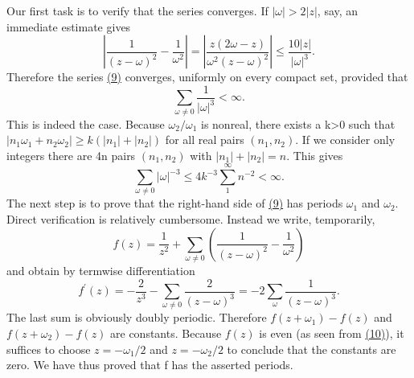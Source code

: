 Our first task is to verify that the series converges. If $|\omega| > 2|z|$, say, an immediate estimate gives
\begin{equation*}
\left| \frac {1}{(z - \omega) ^ {2}} - \frac {1}{\omega^ {2}} \right| = \left| \frac {z (2 \omega - z)}{\omega^ {2} (z - \omega) ^ {2}} \right| \leq \frac {10 | z |}{| \omega | ^ {3}}.
\end{equation*}
Therefore the series \hyperref[eq:7.9]{(9)} converges, uniformly on every compact set, provided that
\begin{equation*}
\sum_ {\omega \neq 0} \frac {1}{| \omega | ^ {3}} <   \infty .
\end{equation*}
This is indeed the case. Because $\omega_{2}/\omega_{1}$ is nonreal, there exists a k>0 such that $|n_{1}\omega_{1}+n_{2}\omega_{2}|\geq k(|n_{1}|+|n_{2}|)$ for all real pairs $(n_{1},n_{2})$. If we consider only integers there are 4n pairs $(n_{1},n_{2})$ with $|n_{1}|+|n_{2}|=n$. This gives
\begin{equation*}
\sum_ {\omega \neq 0} | \omega | ^ {- 3} \leq 4 k ^ {- 3} \sum_ {1} ^ {\infty} n ^ {- 2} <   \infty .
\end{equation*}
The next step is to prove that the right-hand side of \hyperref[eq:7.9]{(9)} has periods $\omega_{1}$ and $\omega_{2}$. Direct verification is relatively cumbersome. Instead we write, temporarily,
\begin{equation*}
f (z) = \frac {1}{z ^ {2}} + \sum_ {\omega \neq 0} \left(\frac {1}{(z - \omega) ^ {2}} - \frac {1}{\omega^ {2}}\right)\tag{10}\label{eq:7.10}
\end{equation*}
and obtain by termwise differentiation
\begin{equation*}
f ^ {\prime} (z) = - \frac {2}{z ^ {3}} - \sum_ {\omega \neq 0} \frac {2}{(z - \omega) ^ {3}} = - 2 \sum_ {\omega} \frac {1}{(z - \omega) ^ {3}}.
\end{equation*}
The last sum is obviously doubly periodic. Therefore $f(z + \omega_{1}) - f(z)$ and $f(z + \omega_{2}) - f(z)$ are constants. Because $f(z)$ is even (as seen from \hyperref[eq:7.10]{(10)}), it suffices to choose $z = -\omega_{1}/2$ and $z = -\omega_{2}/2$ to conclude that the constants are zero. We have thus proved that f has the asserted periods.

